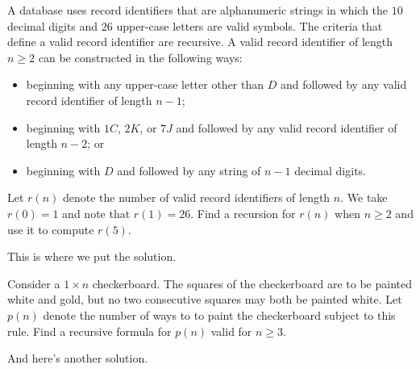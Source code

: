   \begin{exercise}
  A database uses record identifiers that are alphanumeric
    strings in which the $10$ decimal digits and $26$ upper-case
    letters are valid symbols. The criteria that define a valid record
    identifier are recursive. A valid record identifier of length
    $n\geq 2$ can be constructed in the following ways:
    \begin{itemize}
    \item beginning with any upper-case letter other than $D$ and
      followed by any valid record identifier of length $n-1$;
    \item beginning with $1C$, $2K$, or $7J$ and followed by any valid
      record identifier of length $n-2$; or
    \item beginning with $D$ and followed by any string of $n-1$
      decimal digits.
    \end{itemize}
    Let $r(n)$ denote the number of valid record identifiers of length
    $n$. We take $r(0)=1$ and note that $r(1) = 26$. Find a recursion
    for $r(n)$ when $n\geq 2$ and use it to compute $r(5)$.
    \begin{mysolution}
      This is where we put the solution.
    \end{mysolution}
  \end{exercise}
  \begin{exercise}
    Consider a $1\times n$ checkerboard. The squares of the
    checkerboard are to be painted white and gold, but no two
    consecutive squares may both be painted white. Let $p(n)$ denote
    the number of ways to to paint the checkerboard subject to this
    rule. Find a recursive formula for $p(n)$ valid for $n\geq 3$.
    \begin{mysolution}
      And here's another solution.
    \end{mysolution}
  \end{exercise}


